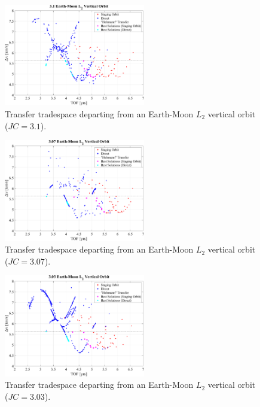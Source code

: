 \begin{figure}[ht]
    \centering
    \includegraphics[width=0.55\textwidth]{figures/TradeSpace_L2Vertical_3_10.pdf}
    \caption{Transfer tradespace departing from an Earth-Moon $L_{2}$ vertical orbit ($JC=3.1$).}
\end{figure}

\begin{figure}[ht]
    \centering
    \includegraphics[width=0.55\textwidth]{figures/TradeSpace_L2Vertical_3_07.pdf}
    \caption{Transfer tradespace departing from an Earth-Moon $L_{2}$ vertical orbit ($JC=3.07$).}
\end{figure}
\clearpage

\begin{figure}[ht]
    \centering
    \includegraphics[width=0.55\textwidth]{figures/TradeSpace_L2Vertical_3_03.pdf}
    \caption{Transfer tradespace departing from an Earth-Moon $L_{2}$ vertical orbit ($JC=3.03$).}
\end{figure}

